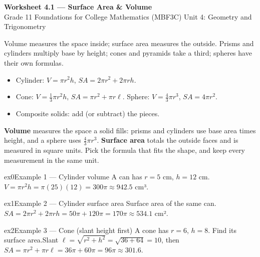 \documentclass[11pt]{article}
\begin{document}
\begin{center}
{\LARGE\bfseries\color{titleblue}Worksheet 4.1 --- Surface Area \& Volume}\\[2pt]
{\small Grade 11 Foundations for College Mathematics (MBF3C) \textperiodcentered{} Unit 4: Geometry and Trigonometry}
\end{center}

\begin{ideabox}
Volume measures the space inside; surface area measures the outside. Prisms and cylinders multiply base by height; cones and pyramids take a third; spheres have their own formulas.
\begin{itemize}[leftmargin=*,itemsep=2pt]
  \item Cylinder: $V=\pi r^2 h$, $SA=2\pi r^2+2\pi r h$.
  \item Cone: $V=\tfrac13\pi r^2 h$, $SA=\pi r^2+\pi r\ell$. Sphere: $V=\tfrac43\pi r^3$, $SA=4\pi r^2$.
  \item Composite solids: add (or subtract) the pieces.
\end{itemize}
\end{ideabox}

\begin{learnbox}
\textbf{Volume} measures the space a solid fills: prisms and cylinders use base area times height, and a sphere uses $\tfrac43\pi r^3$.
\textbf{Surface area} totals the outside faces and is measured in square units.
Pick the formula that fits the shape, and keep every measurement in the same unit.
\end{learnbox}


\begin{example}{ex0}{Example 1 --- Cylinder volume}
A can has $r=5$ cm, $h=12$ cm.\soln $V=\pi r^2 h=\pi(25)(12)=300\pi\approx942.5$ cm³.
\end{example}

\begin{example}{ex1}{Example 2 --- Cylinder surface area}
Surface area of the same can.\soln $SA=2\pi r^2+2\pi rh=50\pi+120\pi=170\pi\approx534.1$ cm².
\end{example}

\begin{example}{ex2}{Example 3 --- Cone (slant height first)}
A cone has $r=6$, $h=8$. Find its surface area.\soln Slant $\ell=\sqrt{r^2+h^2}=\sqrt{36+64}=10$, then $SA=\pi r^2+\pi r\ell=36\pi+60\pi=96\pi\approx301.6$.
\end{example}
\end{document}
